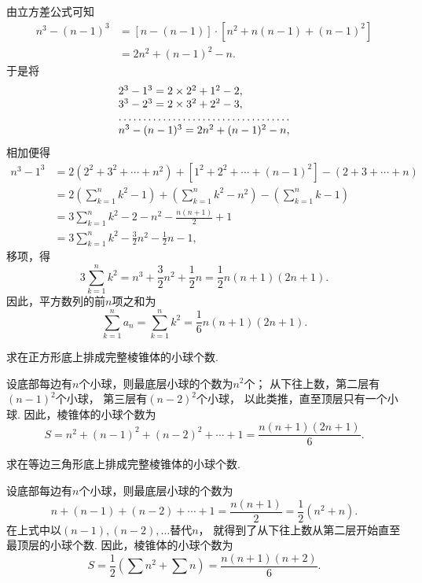 由立方差公式可知
\[\begin{aligned}
n^3 - (n-1)^3
&= [n - (n-1)] \cdot [n^2 + n(n-1) + (n-1)^2] \\
&= 2n^2 + (n-1)^2 - n.
\end{aligned}\]于是将\[
\begin{array}{l}
2^3 - 1^3 = 2\times2^2+1^2-2, \\
3^3 - 2^3 = 2\times3^2+2^2-3, \\
\hdotsfor{1} \\
n^3 - (n-1)^3 = 2n^2 + (n-1)^2 - n,
\end{array}
\]相加便得\[\begin{aligned}
n^3 - 1^3
&= 2(2^2+3^2+\dotsb+n^2) + [1^2+2^2+\dotsb+(n-1)^2] - (2+3+\dotsb+n) \\
&= 2\left(\sum\limits_{k=1}^n k^2 - 1\right)
    + \left(\sum\limits_{k=1}^n k^2 - n^2\right)
    - \left(\sum\limits_{k=1}^n k - 1\right) \\
&= 3\sum\limits_{k=1}^n k^2 - 2 - n^2 - \frac{n(n+1)}{2} + 1 \\
&= 3\sum\limits_{k=1}^n k^2 - \frac{3}{2} n^2 - \frac{1}{2} n - 1,
\end{aligned}\]
移项，得\[
3 \sum\limits_{k=1}^n k^2
= n^3 + \frac{3}{2} n^2 + \frac{1}{2} n
= \frac{1}{2} n (n+1) (2n+1).
\]
因此，平方数列的前\(n\)项之和为
\begin{equation}
\sum\limits_{k=1}^n a_n
= \sum\limits_{k=1}^n k^2
= \frac{1}{6} n(n+1)(2n+1).
\end{equation}

\begin{example}
求在正方形底上排成完整棱锥体的小球个数.
\begin{solution}
设底部每边有\(n\)个小球，则最底层小球的个数为\(n^2\)个；
从下往上数，第二层有\((n-1)^2\)个小球，
第三层有\((n-2)^2\)个小球，
以此类推，直至顶层只有一个小球.
因此，棱锥体的小球个数为\[
    S = n^2+(n-1)^2+(n-2)^2+\dotsb+1
    = \frac{n(n+1)(2n+1)}{6}.
\]
\end{solution}
\end{example}

\begin{example}
求在等边三角形底上排成完整棱锥体的小球个数.
\begin{solution}
设底部每边有\(n\)个小球，则最底层小球的个数为\[
    n+(n-1)+(n-2)+\dotsb+1
    = \frac{n(n+1)}{2}
    = \frac{1}{2}(n^2+n).
\]
在上式中以\((n-1),(n-2),\dotsc\)替代\(n\)，
就得到了从下往上数从第二层开始直至最顶层的小球个数.
因此，棱锥体的小球个数为\[
    S = \frac{1}{2} (\sum n^2 + \sum n)
    = \frac{n(n+1)(n+2)}{6}.
\]
\end{solution}
\end{example}

